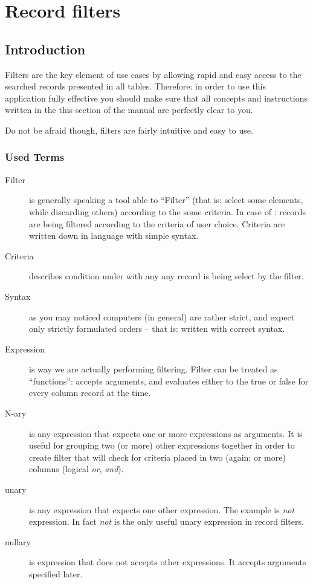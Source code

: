 \section{Record filters}
\subsection{Introduction}
Filters are the key element of \OCS{} use cases by allowing rapid and easy access to the searched records presented in all tables.
Therefore: in order to use this application fully effective you should make sure that all concepts and instructions written in
the this section of the manual are perfectly clear to you.

Do not be afraid though, filters are fairly intuitive and easy to use.

\subsubsection{Used Terms}

\begin{description}
 \item[Filter] is generally speaking a tool able to ``Filter'' (that is: select some elements, while discarding others) according
 to the some criteria. In case of \OCS: records are being filtered according to the criteria of user choice. Criteria are written
 down in language with simple syntax.
 \item[Criteria] describes condition under with any any record is being select by the filter.
 \item[Syntax] as you may noticed computers (in general) are rather strict, and expect only strictly formulated orders -- that is:
 written with correct syntax.
 \item[Expression] is way we are actually performing filtering. Filter can be treated as ``functions'': accepts arguments, and evaluates
 either to the true or false for every column record at the time.
 \item[N-ary] is any expression that expects one or more expressions as arguments. It is useful for grouping two (or more) other expressions
 together in order to create filter that will check for criteria placed in two (again: or more) columns (logical \textit{or}, \textit{and}).
 \item[unary] is any expression that expects one other expression. The example is \textit{not} expression. In fact \textit{not} is the only useful
 unary expression in \OCS{} record filters.
 \item[nullary] is expression that does not accepts other expressions. It accepts arguments specified later.
\end{description}

